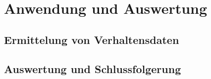 \chapter{Anwendung und Auswertung}
\label{cha:auswertung}

\section{Ermittelung von Verhaltensdaten}
\label{sec:testing}

\section{Auswertung und Schlussfolgerung}
\label{sec:results}
